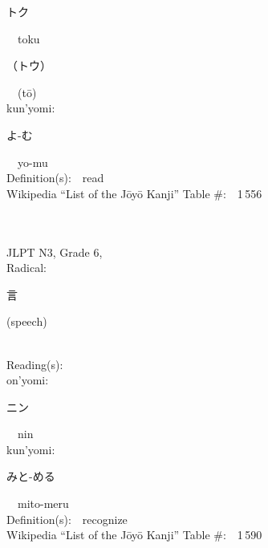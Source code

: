 \begin{multicols}{2}
{\hspace*{2em}}{\begin{CJK}{UTF8}{min} トク \end{CJK}}\ \ toku\ \ \\
{\hspace*{2em}}{\begin{CJK}{UTF8}{min} （トウ） \end{CJK}}\ \ (t\=o)\ \ \\
{\hspace*{1em}}kun'yomi:\ \ \\
{\hspace*{2em}}{\begin{CJK}{UTF8}{min} よ-む \end{CJK}}\ \ yo-mu\ \ \\
Definition(s):\ \ read \\
Wikipedia ``List of the J\=oy\=o Kanji'' Table \#:\ \ 1\,556 \\
\ \ \\
{\fontsize{34pt}{40pt}  }\ \ \\  %
{JLPT N3, Grade 6, \\Radical:\ \ {\begin{CJK}{UTF8}{min} 言 \end{CJK}} (speech) } \\
Reading(s):\ \ \\
{\hspace*{1em}}on'yomi:\ \ \\
{\hspace*{2em}}{\begin{CJK}{UTF8}{min} ニン \end{CJK}}\ \ nin\ \ \\
{\hspace*{1em}}kun'yomi:\ \ \\
{\hspace*{2em}}{\begin{CJK}{UTF8}{min} みと-める \end{CJK}}\ \ mito-meru\ \ \\
Definition(s):\ \ recognize \\
Wikipedia ``List of the J\=oy\=o Kanji'' Table \#:\ \ 1\,590 \\
\ \ \\
{\fontsize{34pt}{40pt}  }\ \ \\  %

\end{multicols}
